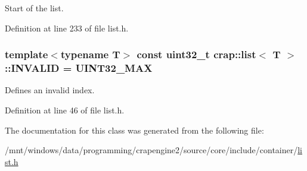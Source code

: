 Start of the list. 



Definition at line 233 of file list.\+h.

\hypertarget{classcrap_1_1list_af6ca677970fb2d6f6f22b82d89e9b183}{
\subsubsection[{I\+N\+V\+A\+L\+I\+D}]{\setlength{\rightskip}{0pt plus 5cm}template$<$typename T$>$ const uint32\+\_\+t {\bf crap\+::list}$<$ T $>$\+::I\+N\+V\+A\+L\+I\+D = {\bf U\+I\+N\+T32\+\_\+\+M\+A\+X}\hspace{0.3cm}{\ttfamily [static]}}}\label{classcrap_1_1list_af6ca677970fb2d6f6f22b82d89e9b183}


Defines an invalid index. 



Definition at line 46 of file list.\+h.



The documentation for this class was generated from the following file\+:\begin{DoxyCompactItemize}
\item 
/mnt/windows/data/programming/crapengine2/source/core/include/container/\hyperlink{list_8h}{list.\+h}\end{DoxyCompactItemize}
